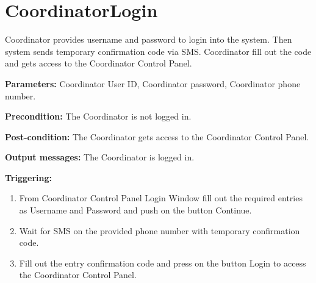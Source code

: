 \section{CoordinatorLogin}
\label{operation:CoordinatorLogin}
Coordinator provides username and password to login into the system. 
Then system sends temporary confirmation code via SMS. 
Coordinator fill out the code and gets access to the Coordinator Control Panel.
\begin{description}

\item \textbf{Parameters:} Coordinator User ID, Coordinator password,
Coordinator phone number.
\item \textbf{Precondition:} The Coordinator is not logged in.
\item \textbf{Post-condition:} The Coordinator gets access to the
Coordinator Control Panel.
\item \textbf{Output messages:} The Coordinator is logged in.

\item \textbf{Triggering:}
\begin{enumerate}
\item From Coordinator Control Panel Login Window fill out the required entries as Username and Password and push on the button Continue.
\item Wait for SMS on the provided phone number with temporary confirmation code.
\item Fill out the entry confirmation code and press on the button Login to
access the Coordinator Control Panel.
\end{enumerate}
 
\end{description}

